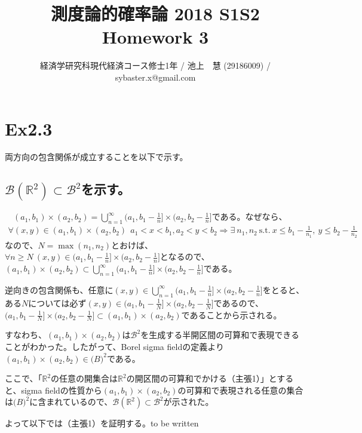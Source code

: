 \documentclass{article}
\begin{document}
\title{測度論的確率論 2018 S1S2 \\ 
Homework 3}
\author{経済学研究科現代経済コース修士1年 / 池上　慧 (29186009) / sybaster.x@gmail.com}
\maketitle

\section{Ex2.3}
両方向の包含関係が成立することを以下で示す。

\subsection{$\mathcal{B}\left( \mathbb{R}^2 \right) \subset \mathcal{B}^2$を示す。}
　$(a_1, b_1)\times (a_2,b_2) = \bigcup_{n=1}^{\infty} (a_1, b_1 -\frac{1}{n}] \times(a_2, b_2-\frac{1}{n}]$である。なぜなら、
\begin{align*}
	\forall (x, y) \in (a_1, b_1)\times (a_2,b_2)\ \ a_1 < x < b_1, a_2 < y<b_2
	\Rightarrow
	\exists\ n_1,n_2\ \text{s.t.}\ x\leq b_1-\frac{1}{n_1},\ y\leq b_2-\frac{1}{n_2}
\end{align*}
なので、$N = \max(n_1, n_2)$とおけば、$\forall n\geq N\ (x,y) \in (a_1, b_1 -\frac{1}{n}] \times(a_2, b_2-\frac{1}{n}]$となるので、$(a_1, b_1)\times (a_2,b_2) \subset \bigcup_{n=1}^{\infty} (a_1, b_1 -\frac{1}{n}] \times(a_2, b_2-\frac{1}{n}]$である。

逆向きの包含関係も、任意に$(x,y)\in \bigcup_{n=1}^{\infty} (a_1, b_1 -\frac{1}{n}] \times(a_2, b_2-\frac{1}{n}]$をとると、ある$N$については必ず$(x, y)\in (a_1, b_1 -\frac{1}{N}] \times(a_2, b_2-\frac{1}{N}]$であるので、$(a_1, b_1 -\frac{1}{N}] \times(a_2, b_2-\frac{1}{N}] \subset (a_1,b_1)\times(a_2,b_2)$であることから示される。

すなわち、$(a_1,b_1)\times(a_2,b_2)$は$\mathcal{B}^2$を生成する半開区間の可算和で表現できることがわかった。したがって、Borel sigma fieldの定義より$(a_1,b_1)\times(a_2,b_2) \in \mathcal(B)^2$である。

ここで、「$\mathbb{R}^2$の任意の開集合は$\mathbb{R}^2$の開区間の可算和でかける（主張1）」とすると、sigma fieldの性質から$(a_1,b_1)\times(a_2,b_2)$の可算和で表現される任意の集合は$\mathcal(B)^2$に含まれているので、$\mathcal{B}\left( \mathbb{R}^2 \right) \subset \mathcal{B}^2$が示された。

よって以下では（主張1）を証明する。to be written
\end{document}

